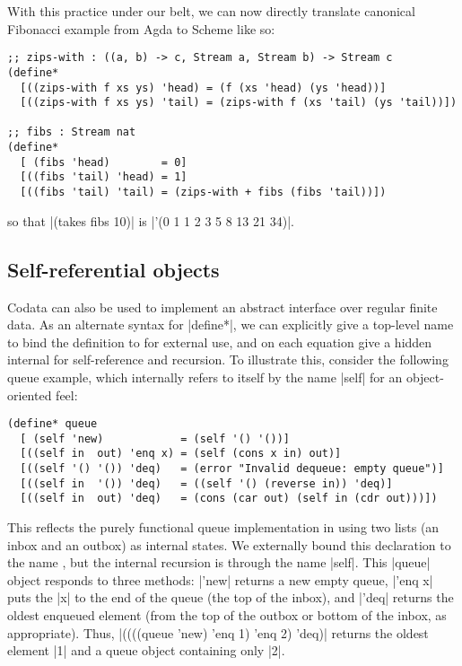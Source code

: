 


With this practice under our belt, we can now directly translate canonical Fibonacci example from Agda to Scheme like so:
\begin{verbatim}
;; zips-with : ((a, b) -> c, Stream a, Stream b) -> Stream c
(define*
  [((zips-with f xs ys) 'head) = (f (xs 'head) (ys 'head))]
  [((zips-with f xs ys) 'tail) = (zips-with f (xs 'tail) (ys 'tail))])

;; fibs : Stream nat
(define*
  [ (fibs 'head)        = 0]
  [((fibs 'tail) 'head) = 1]
  [((fibs 'tail) 'tail) = (zips-with + fibs (fibs 'tail))])
\end{verbatim}
so that \scm|(takes fibs 10)| is \scm|'(0 1 1 2 3 5 8 13 21 34)|.

\subsection{Self-referential objects}

Codata can also be used to implement an abstract interface over regular finite data.
As an alternate syntax for \scm|define*|, we can explicitly give a top-level name to bind the definition to for external use, and on each equation give a hidden internal for self-reference and recursion.
To illustrate this, consider the following queue example, which internally refers to itself by the name \scm|self| for an object-oriented feel:
\begin{verbatim}
(define* queue
  [ (self 'new)            = (self '() '())]
  [((self in  out) 'enq x) = (self (cons x in) out)]
  [((self '() '()) 'deq)   = (error "Invalid dequeue: empty queue")]
  [((self in  '()) 'deq)   = ((self '() (reverse in)) 'deq)]
  [((self in  out) 'deq)   = (cons (car out) (self in (cdr out)))])
\end{verbatim}
This reflects the purely functional queue implementation in using two lists (an inbox and an outbox) as internal states.
We externally bound this declaration to the name , but the internal recursion is through the name \scm|self|.
This \scm|queue| object responds to three methods: \scm|'new| returns a new empty queue, \scm|'enq x| puts the \scm|x| to the end of the queue (\ie the top of the inbox), and \scm|'deq| returns the oldest enqueued element (from the top of the outbox or bottom of the inbox, as appropriate).
Thus, \scm|((((queue 'new) 'enq 1) 'enq 2) 'deq)| returns the oldest element \scm|1| and a queue object containing only \scm|2|.


